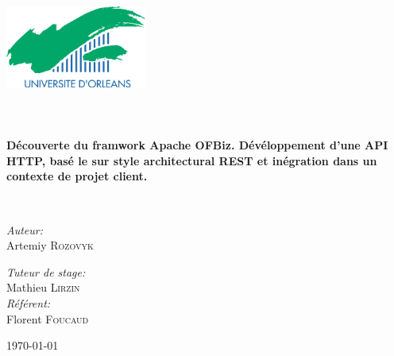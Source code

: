 \begin{titlepage}
\begin{center}

\includegraphics[width=0.35\textwidth]{./logo}~\\[1cm]


\textsc{\Large }\\[0.5cm]

\HRule \\[0.4cm]

{\huge \bfseries \\ Découverte du framwork Apache OFBiz.
Dévéloppement d'une API HTTP, basé le sur style architectural REST et inégration dans un contexte de projet client. \\[0.4cm] }

\HRule \\[1.5cm]

\begin{minipage}{0.4\textwidth}
\begin{flushleft} \large
\emph{Auteur:}\\
Artemiy \textsc{Rozovyk}\\

\end{flushleft}
\end{minipage}
\begin{minipage}{0.4\textwidth}
\begin{flushright} \large
\emph{Tuteur de stage:} \\
Mathieu \textsc{Lirzin}\\
\emph{Référent:} \\
Florent \textsc{Foucaud}
\end{flushright}
\end{minipage}

\vfill

{\large \today}

\end{center}
\end{titlepage}